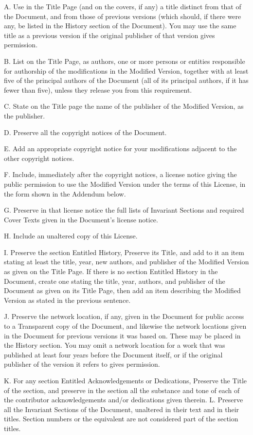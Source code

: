 \documentclass[captions=tableheading]{scrbook}
\begin{document}
A. Use in the Title Page (and on the covers, if any) a title distinct from that of the Document, and from those of previous versions (which should, if there were any, be listed in the History section of the Document). You may use the same title as a previous version if the original publisher of that version gives permission. 

B. List on the Title Page, as authors, one or more persons or entities responsible for authorship of the modifications in the Modified Version, together with at least five of the principal authors of the Document (all of its principal authors, if it has fewer than five), unless they release you from this requirement. 

C. State on the Title page the name of the publisher of the Modified Version, as the publisher. 

D. Preserve all the copyright notices of the Document. 

E. Add an appropriate copyright notice for your modifications adjacent to the other copyright notices. 

F. Include, immediately after the copyright notices, a license notice giving the public permission to use the Modified Version under the terms of this License, in the form shown in the Addendum below.  

G. Preserve in that license notice the full lists of Invariant Sections and required Cover Texts given in the Document's license notice. 

H. Include an unaltered copy of this License. 

I. Preserve the section Entitled History, Preserve its Title, and add to it an item stating at least the title, year, new authors, and publisher of the Modified Version as given on the Title Page. If there is no section Entitled History in the Document, create one stating the title, year, authors, and publisher of the Document as given on its Title Page, then add an item describing the Modified Version as stated in the previous sentence. 

J. Preserve the network location, if any, given in the Document for public access to a Transparent copy of the Document, and likewise the network locations given in the Document for previous versions it was based on. These may be placed in the History section. You may omit a network location for a work that was published at least four years before the Document itself, or if the original publisher of the version it refers to gives permission. 

K. For any section Entitled Acknowledgements or Dedications, Preserve the Title of the section, and preserve in the section all the substance and tone of each of the contributor acknowledgements and/or dedications given therein. 
L. Preserve all the Invariant Sections of the Document, unaltered in their text and in their titles. Section numbers or the equivalent are not considered part of the section titles. 
\end{document}
